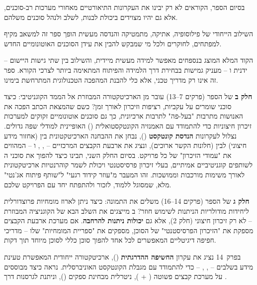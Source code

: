 בסיום הספר, הקוראים לא רק יבינו את העקרונות התיאורטיים מאחורי מערכות רב-סוכנים, אלא גם יהיו מצוידים ביכולת לבנות, לשלב ולנהל סוכנים משלהם.

השילוב הייחודי של פילוסופיה, אתיקה, מתמטיקה והנדסה מעשית הופך ספר זה למשאב מקיף למפתחים, לחוקרים ולכל מי שמבקש להבין את עידן הסוכנים האוטונומיים החדש.

הקוד המלא המוצג בנספחים מאפשר למידה מעשית מיידית, והשילוב בין שתי גישות היישום – ידנית ו – מעניק גמישות בבחירת דרך הלמידה והפיתוח המתאימה ביותר לצרכי הקורא. ספר זה אינו רק מדריך טכני, אלא כלי להבנת המהפכה הטכנולוגית המתרחשת בימינו.


\textbf{חלק ב} של הספר (פרקים \num{7}–\num{13}) עובר מן הארכיטקטורה המבוזרת אל הממד הקוגניטיבי: כיצד סוכני  שומרים על עקביות, רציפות וזיכרון לאורך זמן? כשם שהמצאת הכתב הפכה את האנושות מתרבות "בעל-פה" לתרבות ארכיונית, כך גם סוכנים אוטונומיים זקוקים למערכות זיכרון חיצוניות כדי להתמודד עם האמנזיה הקונטקסטואלית () האופיינית למודלי שפה גדולים. נצלול לעקרונות \textbf{הנדסת קונטקסט} (), נבחן את ההבחנה הארכיטקטונית בין  (אחזור מידע חיצוני) לבין  (חלונות הקשר ארוכים), ונציג את ארבעת הקבצים המרכזיים – , ,  ו – המהווים את "עמודי הזיכרון" של כל פרויקט. בסיום החלק השני, תבינו כיצד להפוך את סוכני ה לשותפים קוגניטיביים אמיתיים, בעלי זיכרון פרסיסטנטי ויכולת לשמר קוהרנטיות ארכיטקטונית לאורך משימות מורכבות וממושכות. זהו המעבר מ"עוזר קידוד רגעי" ל"שותף פיתוח אג'נטי" מלא, שמסוגל ללמוד, לזכור ולהתפתח יחד עם הפרויקט שלכם.


\textbf{חלק ג} של הספר (פרקים \num{14}–\num{16}) משלים את התמונה: כיצד ניתן לארוז מומחיות פרוצדורלית ליחידות מודולריות הניתנות לשימוש חוזר?  ב מייצגים את השלב הבא של הקוגניציה המבוזרת – לא רק זיכרון חיצוני (חלק \num{2}), אלא גם \textbf{יכולות ניתנות להרחבה}. אם מערכת ארבעת הקבצים מספקת את "הזיכרון הפרסיסטנטי" של הסוכן,  מספקים את "ספריית המומחיות" שלו – מדריכי חפיפה דיגיטליים המאפשרים לכל אחד להפוך סוכן כללי לסוכן מיוחד תוך דקות.

בפרק~\num{14} נציג את עקרון \textbf{החשיפה ההדרגתית} (), ארכיטקטורה ייחודית המאפשרת טעינת מידע בשלבים – , ,  – כדי להתמודד עם מגבלת הקונטקסט האוניברסלית. נראה כיצד  מבוססים על מערכת קבצים פשוטה ( + ), ניטרלית מבחינת ספקים (), וניתנת לגרסנות דרך .


